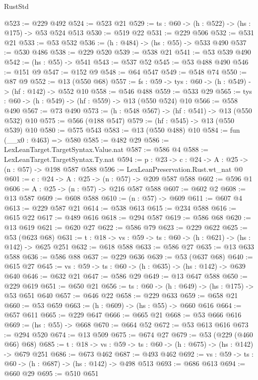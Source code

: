 \begin{lexlean}{RustStd}
\begin{coremodule}
@523 := @229 @492
@524 := @523 @21
@529 := {ts : @60} -> (h : @522) -> (hs : @175) -> @53 @524 @513
@530 := @519 @22
@531 := @229 @506
@532 := @531 @21
@533 := @53 @532
@536 := (h : @484) -> (hs : @55) -> @533 @490
@537 := @530 @486
@538 := @229 @520
@539 := @538 @21
@541 := @53 @539 @490
@542 := (hs : @55) -> @541
@543 := @537 @52
@545 := @53 @488 @490
@546 := @151 @9
@547 := @152 @9
@548 := @64 @547
@549 := @548 @74
@550 := @87 @9
@552 := @13 (@550 @68)
@557 := {fs : @59} -> {tys : @60} -> (h : @549) -> (hf : @142) -> @552 @10
@558 := @546 @488
@559 := @533 @29
@565 := {tys : @60} -> (h : @549) -> (hf : @559) -> @13 (@550 @524) @10
@566 := @558 @490
@567 := @73 @490
@573 := (h : @548 @567) -> (hf : @541) -> @13 (@550 @532) @10
@575 := @566 (@188 @547)
@579 := (hf : @545) -> @13 (@550 @539) @10
@580 := @575 @543
@583 := @13 (@550 @488) @10
@584 := fun (__x0 : @463) => @580
@585 := @482 @29
@586 := LexLeanTarget.TargetSyntax.Value.nat
@587 := @586 @4
@588 := LexLeanTarget.TargetSyntax.Ty.nat
@594 := {p : @23} -> {c : @24} -> {A : @25} -> (n : @57) -> @198 @587 @588
@596 := LexLeanPreservation.Rust.wt_nat @0
@601 := {c : @24} -> {A : @25} -> (n : @57) -> @209 @587 @588
@602 := @596 @1
@606 := {A : @25} -> (n : @57) -> @216 @587 @588
@607 := @602 @2
@608 := @13 @587
@609 := @608 @588
@610 := (n : @57) -> @609
@611 := @607 @4
@613 := @229 @587 @21
@614 := @538 @613
@615 := @234 @588
@616 := @615 @22
@617 := @489 @616
@618 := @294 @587
@619 := @586 @68
@620 := @13 @619
@621 := @620 @27
@622 := @586 @79
@623 := @229 @622
@625 := @53 (@623 @68)
@631 := {t : @18} -> {vs : @59} -> {ts : @60} -> (h : @621) -> (hs : @142) -> @625 @251
@632 := @618 @588
@633 := @586 @27
@635 := @13 @633 @588
@636 := @586 @88
@637 := @229 @636
@639 := @53 (@637 @68)
@640 := @615 @27
@645 := {vs : @59} -> {ts : @60} -> (h : @635) -> (hs : @142) -> @639 @640
@646 := @632 @21
@647 := @586 @29
@649 := @13 @647 @588
@650 := @229 @619
@651 := @650 @21
@656 := {ts : @60} -> (h : @649) -> (hs : @175) -> @53 @651 @640
@657 := @646 @22
@658 := @229 @633
@659 := @658 @21
@660 := @53 @659
@663 := (h : @609) -> (hs : @55) -> @660 @616
@664 := @657 @611
@665 := @229 @647
@666 := @665 @21
@668 := @53 @666 @616
@669 := (hs : @55) -> @668
@670 := @664 @52
@672 := @53 @613 @616
@673 := @294 @520
@674 := @13 @509
@675 := @674 @27
@679 := @53 (@229 (@460 @66) @68)
@685 := {t : @18} -> {vs : @59} -> {ts : @60} -> (h : @675) -> (hs : @142) -> @679 @251
@686 := @673 @462
@687 := @493 @462
@692 := {vs : @59} -> {ts : @60} -> (h : @687) -> (hs : @142) -> @498 @513
@693 := @686 @613
@694 := @660 @29
@695 := @510 @651

\end{coremodule}
\end{lexlean}
